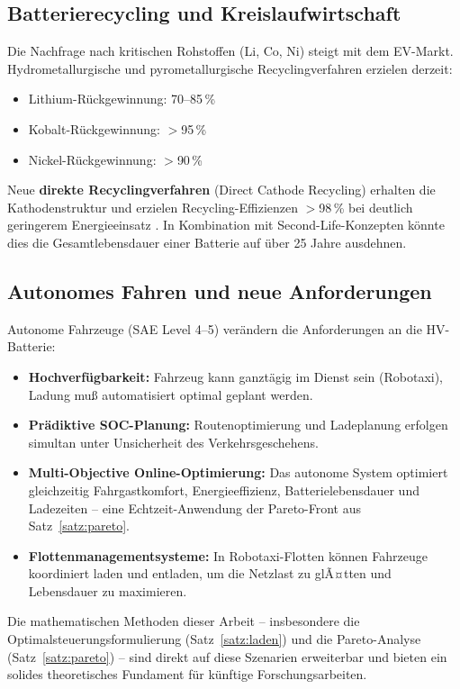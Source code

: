 ﻿\documentclass[a4paper,12pt]{article}
\theoremstyle{definition}
\begin{document}
\subsection{Batterierecycling und Kreislaufwirtschaft}

Die Nachfrage nach kritischen Rohstoffen (Li, Co, Ni) steigt mit dem
EV-Markt. Hydrometallurgische und pyrometallurgische Recyclingverfahren
erzielen derzeit:
\begin{itemize}
  \item Lithium-R\"uckgewinnung: 70--85\,\%
  \item Kobalt-R\"uckgewinnung: $>$95\,\%
  \item Nickel-R\"uckgewinnung: $>$90\,\%
\end{itemize}
Neue \textbf{direkte Recyclingverfahren} (Direct Cathode Recycling) erhalten
die Kathodenstruktur und erzielen Recycling-Effizienzen $>$98\,\% bei
deutlich geringerem Energieeinsatz \cite{Thompson2020}. In Kombination mit
Second-Life-Konzepten k\"onnte dies die Gesamtlebensdauer einer Batterie
auf \"uber 25 Jahre ausdehnen.

\subsection{Autonomes Fahren und neue Anforderungen}

Autonome Fahrzeuge (SAE Level 4--5) ver\"andern die Anforderungen an die
HV-Batterie:
\begin{itemize}
  \item \textbf{Hochverf\"ugbarkeit:} Fahrzeug kann ganzt\"agig im Dienst sein
    (Robotaxi), Ladung mu\ss{} automatisiert optimal geplant werden.
  \item \textbf{Pr\"adiktive SOC-Planung:} Routenoptimierung und Ladeplanung
    erfolgen simultan unter Unsicherheit des Verkehrsgeschehens.
  \item \textbf{Multi-Objective Online-Optimierung:} Das autonome System
    optimiert gleichzeitig Fahrgastkomfort, Energieeffizienz,
    Batterielebensdauer und Ladezeiten -- eine Echtzeit-Anwendung
    der Pareto-Front aus Satz~\ref{satz:pareto}.
  \item \textbf{Flottenmanagementsysteme:} In Robotaxi-Flotten k\"onnen
    Fahrzeuge koordiniert laden und entladen, um die Netzlast zu glÃ¤tten
    und Lebensdauer zu maximieren.
\end{itemize}

Die mathematischen Methoden dieser Arbeit -- insbesondere die
Optimalsteuerungsformulierung (Satz~\ref{satz:laden}) und die
Pareto-Analyse (Satz~\ref{satz:pareto}) -- sind direkt auf diese
Szenarien erweiterbar und bieten ein solides theoretisches Fundament
f\"ur k\"unftige Forschungsarbeiten.
\end{document}
